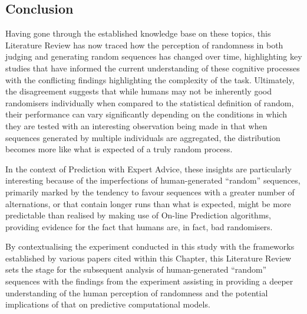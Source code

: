 
\newpage



\subsection{Conclusion}
Having gone through the established knowledge base on these topics, this Literature Review has now traced how the perception of randomness in both judging and generating random sequences has changed over time, highlighting key studies that have informed the current understanding of these cognitive processes with the conflicting findings highlighting the complexity of the task. Ultimately, the disagreement suggests that while humans may not be inherently good randomisers individually when compared to the statistical definition of random, their performance can vary significantly depending on the conditions in which they are tested with an interesting observation being made in that when sequences generated by multiple individuals are aggregated, the distribution becomes more like what is expected of a truly random process.

In the context of Prediction with Expert Advice, these insights are particularly interesting because of the imperfections of human-generated ``random'' sequences, primarily marked by the tendency to favour sequences with a greater number of alternations, or that contain longer runs than what is expected, might be more predictable than realised by making use of On-line Prediction algorithms, providing evidence for the fact that humans are, in fact, bad randomisers.

By contextualising the experiment conducted in this study with the frameworks established by various papers cited within this Chapter, this Literature Review sets the stage for the subsequent analysis of human-generated ``random'' sequences with the findings from the experiment assisting in providing a deeper understanding of the human perception of randomness and the potential implications of that on predictive computational models.